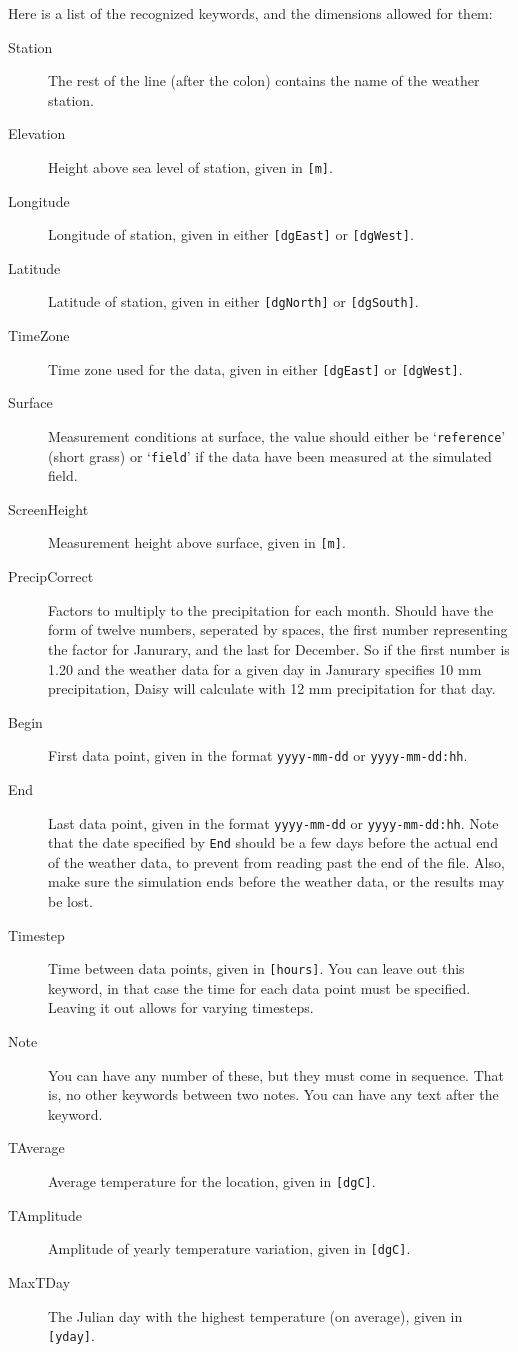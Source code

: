 Here is a list of the recognized keywords, and the dimensions allowed
for them:
\begin{description}
\item[Station] The rest of the line (after the colon) contains the
  name of the weather station.
\item[Elevation] Height above sea level of station, given in
  \texttt{[m]}. 
\item[Longitude] Longitude of station, given in either \texttt{[dgEast]} or
  \texttt{[dgWest]}. 
\item[Latitude] Latitude of station, given in either \texttt{[dgNorth]} or
  \texttt{[dgSouth]}.
\item[TimeZone] Time zone used for the data, given in either
  \texttt{[dgEast]} or \texttt{[dgWest]}.
\item[Surface] Measurement conditions at surface, the value should
  either be `\texttt{reference}' (short grass) or `\texttt{field}' if
  the data have been measured at the simulated field.  
\item[ScreenHeight] Measurement height above surface, given in
  \texttt{[m]}. 
\item[PrecipCorrect] Factors to multiply to the precipitation for each
  month.  Should have the form of twelve numbers, seperated by spaces,
  the first number representing the factor for Janurary, and the last
  for December.  So if the first number is 1.20 and the weather data
  for a given day in Janurary specifies 10 mm precipitation, Daisy
  will calculate with 12 mm precipitation for that day.
\item[Begin] First data point, given in the format
  \texttt{yyyy-mm-dd} or \texttt{yyyy-mm-dd:hh}.
\item[End] Last data point, given in the format \texttt{yyyy-mm-dd} or
  \texttt{yyyy-mm-dd:hh}.  Note that the date specified by
  \texttt{End} should be a few days before the actual end of the
  weather data, to prevent \daisy{} from reading past the end of the
  file.  Also, make sure the simulation ends before the weather data,
  or the results may be lost.
\item[Timestep] Time between data points, given in \texttt{[hours]}.
  You can leave out this keyword, in that case the time for each data
  point must be specified.  Leaving it out allows for varying
  timesteps. 
\item[Note] You can have any number of these, but they must come in
  sequence.  That is, no other keywords between two notes.  You can
  have any text after the keyword. 
\item[TAverage] Average temperature for the location, given in
  \texttt{[dgC]}. 
\item[TAmplitude] Amplitude of yearly temperature variation, given in
  \texttt{[dgC]}. 
\item[MaxTDay] The Julian day with the highest temperature (on
  average), given in \texttt{[yday]}.
\end{description}
